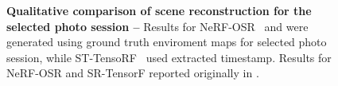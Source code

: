 \begin{figure}[!t]
  \centering
  \shadowsfigure
  \caption{ \textbf{Qualitative comparison of scene reconstruction for the selected photo session -- }
    Results for NeRF-OSR~\cite{rudnev2022nerfosr} and \lumigauss were
    generated using ground truth enviroment maps for selected photo session,
    while ST-TensoRF~\cite{chang2024srtensorf} used extracted timestamp.
    Results for NeRF-OSR and SR-TensorF reported originally in
    \cite{chang2024srtensorf}.
  }
  \label{fig:lumigauss-qual_gt_shadows}
\end{figure}